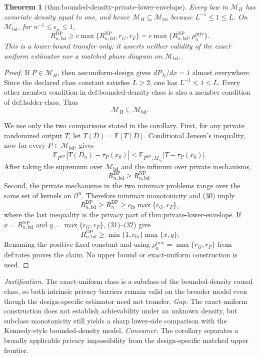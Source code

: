 \documentclass{article}
\newtheorem{theorem}{Theorem}
\begin{document}
\begin{theorem}[thm:bounded-density-private-lower-envelope]\label{thm:bounded-density-private-lower-envelope}
Every law in \(\mathcal M_H\) has covariate density equal to one, and hence \(\mathcal M_H\subseteq\mathcal M_{\mathrm{bd}}\) because \(L^{-1}\le1\le L\).  On \(\mathcal M_{\mathrm{bd}}\), for \(n^{-1}\le\epsilon_n\le1\),
\[
 R_{n,\mathrm{bd}}^{\mathrm{DP}}
 \ge c\max\{R_{n,\mathrm{bd}}^{\mathrm{NP}},r_G,r_F\}
 =c\max\{R_{n,\mathrm{bd}}^{\mathrm{NP}},\rho_n^{\mathrm{priv}}\}.
\]
This is a lower-bound transfer only; it asserts neither validity of the exact-uniform estimator nor a matched phase diagram on \(\mathcal M_{\mathrm{bd}}\).
\end{theorem}
\begin{proof}
If \(P\in\mathcal M_H\), then \(\text{ass:uniform-design}\) gives \(dP_X/dx=1\) almost everywhere.  Since the declared class constant satisfies \(L\ge2\), one has \(L^{-1}\le1\le L\).  Every other member condition in \(\text{def:bounded-density-class}\) is also a member condition of \(\text{def:holder-class}\).  Thus
\[
 \mathcal M_H\subseteq\mathcal M_{\mathrm{bd}}.                                \tag{30}
\]

We use only the two comparisons stated in the corollary.  First, for any private randomized output \(T\), let \(\overline T(D)=\mathbb E[T\mid D]\).  Conditional Jensen's inequality, now for every \(P\in\mathcal M_{\mathrm{bd}}\), gives
\[
 \mathbb E_{P^{\otimes n}}\left|\overline T(D_n)-\tau_P(x_0)\right|
 \le
 \mathbb E_{P^{\otimes n},M_{\varepsilon_n}}
 \left|T-\tau_P(x_0)\right|.
\]
After taking the supremum over \(\mathcal M_{\mathrm{bd}}\) and the infimum over private mechanisms,
\[
 R_{n,\mathrm{bd}}^{\mathrm{DP}}
 \ge R_{n,\mathrm{bd}}^{\mathrm{NP}}.                                           \tag{31}
\]
Second, the private mechanisms in the two minimax problems range over the same set of kernels on \(\mathcal O^n\).  Therefore minimax monotonicity and (30) imply
\[
 R_{n,\mathrm{bd}}^{\mathrm{DP}}
 \ge R_n^{\mathrm{DP}}
 \ge c_{\mathrm{lb}}\max\{r_G,r_F\},                                           \tag{32}
\]
where the last inequality is the privacy part of \(\text{thm:private-lower-envelope}\).  If \(x=R_{n,\mathrm{bd}}^{\mathrm{NP}}\) and \(y=\max\{r_G,r_F\}\), (31)--(32) give
\[
 R_{n,\mathrm{bd}}^{\mathrm{DP}}
 \ge \min\{1,c_{\mathrm{lb}}\}\max\{x,y\}.
\]
Renaming the positive fixed constant and using \(\rho_n^{\mathrm{priv}}=\max\{r_G,r_F\}\) from \(\text{def:rates}\) proves the claim.  No upper bound or exact-uniform construction is used.
\end{proof}
\par\smallskip\noindent \textit{Justification.} The exact-uniform class is a subclass of the bounded-density causal class, so both intrinsic privacy barriers remain valid on the broader model even though the design-specific estimator need not transfer. \textit{Gap.} The exact-uniform construction does not establish achievability under an unknown density, but subclass monotonicity still yields a sharp lower-side comparison with the Kennedy-style bounded-density model. \textit{Consumer.} The corollary separates a broadly applicable privacy impossibility from the design-specific matched upper frontier.
\end{document}
